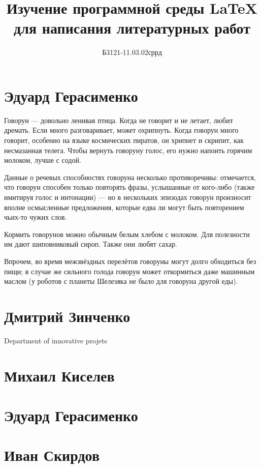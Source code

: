 \documentclass[labwork]{fefudoc}
\author{Б3121-11.03.02сррд}{Дмитрий Зинченко}
\title{Изучение программной среды \LaTeX{} для написания литературных работ}
\begin{document}
\frontpage
\tableofcontents

\section{Эдуард Герасименко}
Говорун — довольно ленивая птица. Когда не говорит и не летает, любит дремать. Если много разговаривает, может охрипнуть. Когда говорун много говорит, особенно на языке космических пиратов, он хрипнет и скрипит, как несмазанная телега. Чтобы вернуть говоруну голос, его нужно напоить горячим молоком, лучше с содой.

Данные о речевых способностях говоруна несколько противоречивы: отмечается, что говорун способен только повторять фразы, услышанные от кого-либо (также имитируя голос и интонации) — но в нескольких эпизодах говорун произносит вполне осмысленные предложения, которые едва ли могут быть повторением чьих-то чужих слов.

Кормить говорунов можно обычным белым хлебом с молоком. Для полезности им дают шиповниковый сироп. Также они любят сахар.

Впрочем, во время межзвёздных перелётов говоруны могут долго обходиться без пищи; в случае же сильного голода говорун может откормиться даже машинным маслом (у роботов с планеты Шелезяка не было для говоруна другой еды).

\section{Дмитрий Зинченко}
Department of innovative projets
\section{Михаил Киселев}
\section{Эдуард Герасименко}
\section{Иван Скирдов}
\end{document}
